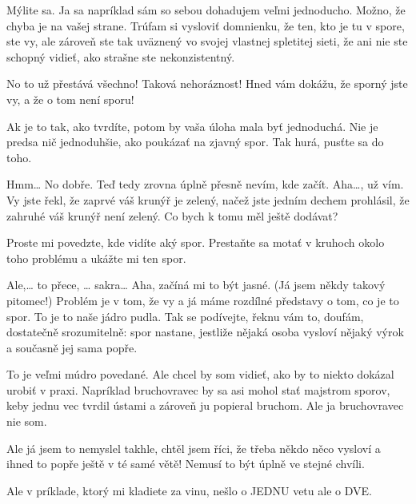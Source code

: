 \documentclass[12pt]{article}
\begin{document}
\begin{description}[itemsep=0pt]
\item[Ž:] Mýlite sa. Ja sa napríklad sám so sebou dohadujem veľmi jednoducho. Možno, 
    že chyba je na vašej strane. Trúfam si vysloviť domnienku, že ten, kto je tu v spore, 
    ste vy, ale zároveň ste tak uväznený vo svojej vlastnej spletitej sieti, že ani 
    nie ste schopný vidieť, ako strašne ste nekonzistentný.

\item[A:] No to už přestává všechno! Taková nehoráznost! Hned vám dokážu, že
    sporný jste vy, a že o tom není sporu!

\item[Ž:] Ak je to tak, ako tvrdíte, potom by vaša úloha mala byť jednoduchá. 
    Nie je predsa nič jednoduhšie, ako poukázať na zjavný spor. Tak hurá, pusťte sa do toho.

\item[A:] Hmm… No dobře. Teď tedy zrovna úplně přesně nevím, kde začít.
    Aha…, už vím. Vy jste řekl, že zaprvé váš krunýř je zelený, načež jste jedním
    dechem prohlásil, že zahruhé váš krunýř není zelený. Co bych k tomu měl
    ještě dodávat?

\item[Ž:] Proste mi povedzte, kde vidíte aký spor. Prestaňte sa motať v kruhoch okolo 
    toho problému a ukážte mi ten spor.

\item[A:] Ale,… to přece, … sakra… Aha, začíná mi to být jasné. (Já jsem někdy takový
    pitomec!) Problém je v tom, že vy a já máme rozdílné představy o tom, co je to spor.
    To je to naše jádro pudla. Tak se podívejte, řeknu vám to, doufám, dostatečně
    srozumitelně: spor nastane, jestliže nějaká osoba vysloví nějaký výrok a současně
    jej sama popře.

\item[Ž:] To je veľmi múdro povedané. Ale chcel by som vidieť, ako by to niekto dokázal 
    urobiť v praxi. Napríklad bruchovravec by sa asi mohol stať majstrom sporov, keby 
    jednu vec tvrdil ústami a zároveň ju popieral bruchom. Ale ja bruchovravec nie som.

\item[A:] Ale já jsem to nemyslel takhle, chtěl jsem říci, že třeba někdo
    něco vysloví a ihned to popře ještě v té samé větě! Nemusí to být úplně ve stejné
    chvíli.

\item[Ž:] Ale v príklade, ktorý mi kladiete za vinu, nešlo o JEDNU vetu ale o DVE.


\end{description}
\end{document}
